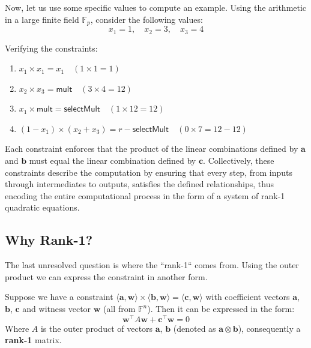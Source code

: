\documentclass[../lecture-notes.tex]{subfiles}
\begin{document}
\begin{example}
    Now, let us use some specific values to compute an example. Using the arithmetic in a large finite
    field $\mathbb{F}_p$, consider the following values:
    \begin{equation*}
        x_1 = 1, \quad x_2 = 3, \quad x_3 = 4
    \end{equation*}

    Verifying the constraints:
    \begin{enumerate}
        \item \( x_1 \times x_1 = x_1 \quad (1 \times 1 = 1) \)
        \item \( x_2 \times x_3 = \mathsf{mult} \quad (3 \times 4 = 12) \)
        \item \( x_1 \times \mathsf{mult} = \mathsf{selectMult} \quad (1 \times 12 = 12) \)
        \item \( (1 - x_1) \times (x_2 + x_3) = r - \mathsf{selectMult} \quad (0 \times 7 = 12 - 12) \)
    \end{enumerate}
\end{example}

Each constraint enforces that the product of the linear combinations defined by $\mathbf{a}$ and $\mathbf{b}$ must
equal the linear combination defined by $\mathbf{c}$. Collectively, these constraints describe the 
computation by ensuring that every step, from inputs through intermediates to outputs, satisfies 
the defined relationships, thus encoding the entire computational process in the form of a system
of rank-1 quadratic equations.

\subsection{Why Rank-1?}
The last unresolved question is where the ``rank-1`` comes from. Using the outer product we can express the constraint in another form.

\begin{lemma}
    Suppose we have a constraint $\langle \mathbf{a}, \mathbf{w}\rangle \times \langle \mathbf{b}, \mathbf{w}\rangle = \langle \mathbf{c}, \mathbf{w} \rangle$ 
    with coefficient vectors $\mathbf{a}$, $\mathbf{b}$, $\mathbf{c}$ and witness vector $\mathbf{w}$ (all from $\mathbb{F}^n$). Then it can be expressed in the 
    form:
    \[ \mathbf{w}^{\top} A \mathbf{w} + \mathbf{c}^{\top} \mathbf{w} = 0 \]
    Where $A$ is the outer product of vectors $\mathbf{a}$, $\mathbf{b}$ (denoted as $\mathbf{a} \otimes \mathbf{b}$), consequently 
    a \textbf{rank-1} matrix.
\end{lemma}
\end{document}
